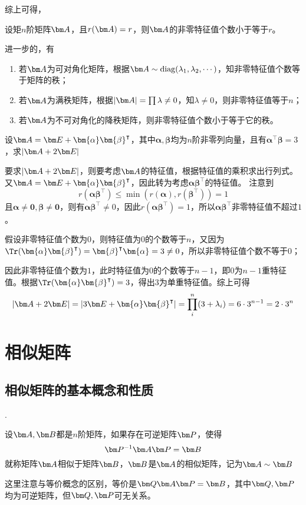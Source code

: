 综上可得，
\begin{theorem}
    设矩$n$阶矩阵$\mat{A}$，且$r(\mat{A})=r$，则$\mat{A}$的非零特征值个数小于等于$r$。
\end{theorem}
进一步的，有
\begin{enumerate}[(1)]
    \item 若$\mat{A}$为可对角化矩阵，根据$\mat{A}\sim \operatorname{diag}(\lambda_1,\lambda_2,\cdots)$，知非零特征值个数等于矩阵的秩；
    \item 若$\mat{A}$为满秩矩阵，根据$|\mat{A}|=\prod \lambda \neq 0$，知$\lambda\neq 0$，则非零特征值等于$n$；
    \item 若$\mat{A}$为不可对角化的降秩矩阵，则非零特征值个数小于等于它的秩。
\end{enumerate}

\begin{example}
    设$\mat{A}=\mat{E}+\bm{\alpha}\bm{\beta}^\intercal$，其中$\bm{\alpha},\bm{\beta}$均为$n$阶非零列向量，且有$\bm{\alpha}^\intercal\bm{\beta}=3$，求$|\mat{A}+2\mat{E}|$
\end{example}
\begin{solution}
    要求$|\mat{A}+2\mat{E}|$，则要考虑$\mat{A}$的特征值，根据特征值的乘积求出行列式。又$\mat{A}=\mat{E}+\bm{\alpha}\bm{\beta}^\intercal$，因此转为考虑$\bm{\alpha}\bm{\beta}^\intercal$的特征值。
    注意到
    \[ r(\bm{\alpha}\bm{\beta}^\intercal) \leq \min(r(\bm{\alpha}),r(\bm{\beta}^\intercal)) = 1 \]
    且$\bm{\alpha}\neq \bm{0},\bm{\beta}\neq \bm{0}$，则有$\bm{\alpha}\bm{\beta}^\intercal\neq 0$，因此$r(\bm{\alpha}\bm{\beta}^\intercal)=1$，所以$\bm{\alpha}\bm{\beta}^\intercal$非零特征值不超过$1$。

    假设非零特征值个数为$0$，则特征值为$0$的个数等于$n$，又因为$\Tr(\bm{\alpha}\bm{\beta}^\intercal)=\bm{\beta}^\intercal\bm{\alpha} = 3\neq 0$，所以非零特征值个数不等于$0$；

    因此非零特征值个数为$1$，此时特征值为$0$的个数等于$n-1$，即$0$为$n-1$重特征值。根据$\Tr(\bm{\alpha}\bm{\beta}^\intercal)=3$，得出$3$为单重特征值。综上可得
    \[ |\mat{A}+2\mat{E}| = |3\mat{E} + \bm{\alpha}\bm{\beta}^\intercal| = \prod_i^n (3+\lambda_i) = 6\cdot 3^{n-1} = 2\cdot 3^n \]

\end{solution}

\section{相似矩阵}
\subsection{相似矩阵的基本概念和性质}
.
\begin{definition}
    设$\mat{A},\mat{B}$都是$n$阶矩阵，如果存在可逆矩阵$\mat{P}$，使得
    \[ \mat{P}^{-1}\mat{A}\mat{P} = \mat{B} \]
    就称矩阵$\mat{A}$相似于矩阵$\mat{B}$，$\mat{B}$是$\mat{A}$的相似矩阵，记为$\mat{A}\sim \mat{B}$
\end{definition}
这里注意与等价概念的区别，等价是$\mat{Q\mat{A}\mat{P}}=\mat{B}$，其中$\mat{Q},\mat{P}$均为可逆矩阵，但$\mat{Q},\mat{P}$可无关系。

